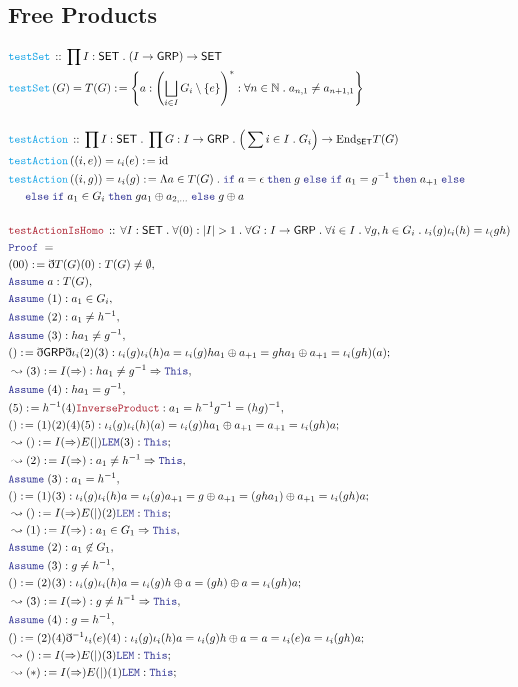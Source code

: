 \documentclass[12pt]{scrartcl}
\newcommand{\FUNC}[1]{\textcolor{Cerulean}{\mathtt{#1}}}
\newcommand{\LOGIC}[1]{\textcolor{Blue}{\mathtt{#1}}}
\newcommand{\THM}[1]{\textcolor{Maroon}{\mathtt{#1}}}
\renewcommand{\.}{\; . \;}
\newcommand{\de}{: \kern 0.1pc =}
\newcommand{\If}{\LOGIC{if} \;}
\newcommand{\Then}{ \; \LOGIC{then} \;}
\newcommand{\Else}{\; \LOGIC{else} \;}
\newcommand{\Act}[1]{\left( #1 \right)}
\newcommand{\Theorem}[2]{& \THM{#1} \, :: \, #2 \\ & \Proof = \\ }
\newcommand{\DeclareFunc}[2]{& \FUNC{#1} \, :: \, #2 \\}
\newcommand{\DefineNamedFunc}[4]{&  \FUNC{#1}\Act{#2} = #3 \de #4 \\}
\newcommand{\NewLine}{\\ & \kern 1pc}
\newcommand{\Page}[1]{ \begin{align*} #1 \end{align*}   }
\newcommand{ \bd }{ \ByDef }
\newcommand{\Nat}{\mathbb{N} }
\DeclareMathOperator*{\id}{id}
\newcommand{\End}{\mathrm{End}}
\newcommand{\Say}[3]{& #1 \de #2 : #3, \\}
\newcommand{\Conclude}[3]{& #1 \de #2 : #3; \\}
\newcommand{\Derive}[3]{& \leadsto #1 \de #2 : #3, \\}
\newcommand{\DeriveConclude}[3]{& \leadsto #1 \de #2 : #3 ; \\}
\newcommand{\Assume}[2]{& \LOGIC{Assume} \; #1 : #2, \\}
\newcommand{\ByDef}{\eth}
\newcommand{\Proof}{\LOGIC{Proof} \; }
\newcommand{\SET}{\mathsf{SET}}
\newcommand{\GRP}{\mathsf{GRP}}
\begin{document}
\subsection{Free Products}
\Page{
	\DeclareFunc{testSet}{ \prod I : \SET \. (I \to \GRP) \to \SET}
	\DefineNamedFunc{testSet}{G}{T(G)}{\left\{ a : \left(\bigsqcup_{i \in I} G_i \setminus \{ e \} \right)^*  : \forall n \in \Nat \. a_{n,1} \neq a_{n+1,1}   \right\}}
	\\
	\DeclareFunc{testAction}{ \prod I : \SET \.  \prod G : I \to \GRP \. 
		\Big(\sum i \in I \. G_i  \Big) \to \End_{\SET} T(G)  }
	\DefineNamedFunc{testAction}{(i,e)}{\iota_i(e)}{\id}
	\DefineNamedFunc{testAction}{(i,g)}{\iota_i(g)}
	{  
		\Lambda a \in  T(G) \. \If a = \epsilon \Then g \Else \If a_1 = g^{-1} \Then a_{+1} \Else 
		\NewLine \Else \If a_1 \in G_i \Then  ga_1 \oplus a_{2,\ldots} \Else g \oplus a 
	}
	\\
	\Theorem{testActionIsHomo}{ \forall I : \SET \. \forall (0) : |I| > 1 \. \forall G : I \to \GRP \. \forall i \in I \. \forall g,h \in G_i \. \iota_i(g)\iota_i(h) = \iota_(gh)}
	\Say{(00)}{\bd T(G)(0)}{T(G) \neq \emptyset}
	\Assume{a}{T(G)}
	\Assume{(1)}{ a_1 \in G_i  }
	\Assume{(2)}{ a_1 \neq h^{-1}  }
	\Assume{(3)}{ha_1 \neq g^{-1}}
	\Conclude{()}{\bd \GRP \bd \iota_i(2)(3)}{ \iota_i(g)\iota_i(h)a = \iota_i(g) ha_1 \oplus a_{+1} = gha_1 \oplus a_{+1}  = \iota_i(gh)(a) }
	\Derive{(3)}{I(\Rightarrow)}{ ha_1 \neq g^{-1} \Rightarrow \LOGIC{This} }
	\Assume{(4)}{ha_1 = g^{-1}}
	\Say{(5)}{ h^{-1}(4)\THM{InverseProduct} }{ a_1 = h^{-1}g^{-1} = (hg)^{-1} }
	\Conclude{()}{(1)(2)(4)(5)}{\iota_i(g)\iota_i(h)(a) = \iota_i(g) ha_1 \oplus a_{+1} = a_{+1} = \iota_i(gh)a}
	\DeriveConclude{()}{I(\Rightarrow)E(|)\LOGIC{LEM}(3)}{\LOGIC{This}}
	\Derive{(2)}{I(\Rightarrow)}{a_1 \neq h^{-1} \Rightarrow \LOGIC{This}  }
	\Assume{(3)}{ a_1 = h^{-1} }
	\Conclude{()}{(1)(3)}{\iota_i(g)\iota_i(h)a = \iota_i(g) a_{+1} = g \oplus a_{+1} = (gha_1) \oplus a_{+1} = \iota_i(gh)a}
	\DeriveConclude{()}{I(\Rightarrow)E(|)(2)\LOGIC{LEM}}{\LOGIC{This}}
	\Derive{(1)}{I(\Rightarrow)}{a_1 \in G_1 \Rightarrow \LOGIC{This}}
	\Assume{(2)}{a_1 \not \in G_1}
	\Assume{(3)}{g \neq h^{-1}}
	\Conclude{()}{(2)(3)}{ \iota_i(g)\iota_i(h) a = \iota_i(g) h \oplus a = (gh) \oplus a = \iota_i(gh) a    }
	\Derive{(3)}{I(\Rightarrow)}{g \neq h^{-1} \Rightarrow \LOGIC{This}}
	\Assume{(4)}{g = h^{-1}}
	\Conclude{()}{(2)(4)\bd^{-1}\iota_i(e)(4)}{\iota_i(g)\iota_i(h) a = \iota_i(g) h \oplus a = a = \iota_i(e) a = \iota_i(gh) a  }
	\DeriveConclude{()}{I(\Rightarrow)E(|)(3)\LOGIC{LEM}}{ \LOGIC{This}  }
	\DeriveConclude{(*)}{I(\Rightarrow)E(|)(1)\LOGIC{LEM}}{ \LOGIC{This}  }
}
\end{document}
